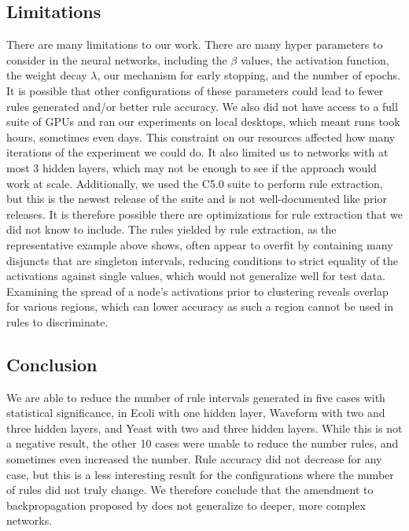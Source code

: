 \subsection{Limitations}
\label{sec:limitations}
There are many limitations to our work. There are many
hyper parameters to consider in the neural networks, including the
$\beta$ values, the activation function, the weight decay $\lambda$,
our mechanism for early stopping, and the number of epochs. It is possible that other configurations of these
parameters could lead to fewer rules generated and/or better rule
accuracy. We also did not have access to a full suite of GPUs
and ran our experiments on local desktops, which meant runs took
hours, sometimes even days. This constraint on our resources affected
how many iterations of the experiment we could do. It also limited us to networks with at most 3 hidden layers, which may not be enough
to see if the approach would work at scale. Additionally, we
used the C5.0 suite to perform rule extraction, but this is the newest
release of the suite and is not well-documented like prior releases. It is
therefore possible there are optimizations for rule extraction that we
did not know to include. The rules yielded by rule extraction, as the representative example above shows, often appear to overfit by containing many disjuncts that are singleton intervals, reducing conditions to strict equality of the activations against single values, which would not generalize well for test data. Examining the spread of a node's activations prior to clustering reveals overlap for various regions, which can lower accuracy as such a region cannot be used in rules to discriminate.

\subsection{Conclusion}
\label{sec:conclusion}

We are able to reduce the number of rule intervals generated in five cases with statistical significance, in Ecoli with one hidden layer, Waveform with two and three hidden layers, and Yeast with two and three hidden layers. While this is not a negative result, the other 10 cases were unable to reduce the number rules, and sometimes even increased the number. Rule accuracy did not decrease for any case, but this is a less interesting result for the configurations where the number of rules did not truly change. We therefore conclude that the amendment to backpropagation proposed by \cite{thuan11} does not generalize to deeper, more complex networks. 

